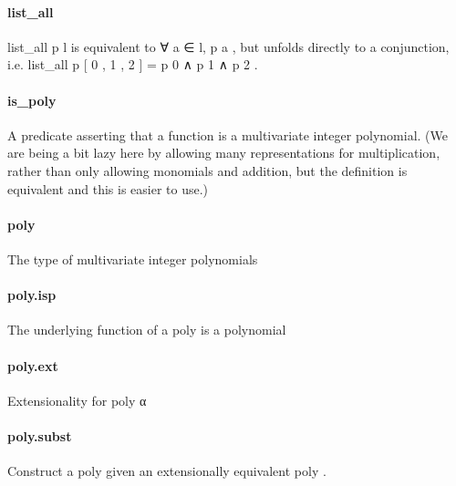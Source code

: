 \documentclass{article}
\begin{document}
\paragraph{list\_all}
\par
\colorbox[RGB]{253,246,227}{{{{\color[RGB]{101, 123, 131} list\_all p l }}}} is equivalent to 
\colorbox[RGB]{253,246,227}{{{{\color[RGB]{101, 123, 131} ∀ a ∈ l, p a }}}}, but unfolds directly to a conjunction,
i.e. 
\colorbox[RGB]{253,246,227}{{{{\color[RGB]{101, 123, 131} list\_all p {[} }}}{{{\color[RGB]{108, 113, 196} 0 }}}{{{\color[RGB]{101, 123, 131} ,  }}}{{{\color[RGB]{108, 113, 196} 1 }}}{{{\color[RGB]{101, 123, 131} ,  }}}{{{\color[RGB]{108, 113, 196} 2 }}}{{{\color[RGB]{101, 123, 131} {]}  }}}{{{\color[RGB]{181, 137, 0} = }}}{{{\color[RGB]{101, 123, 131}  p  }}}{{{\color[RGB]{108, 113, 196} 0 }}}{{{\color[RGB]{101, 123, 131}   }}}{{{\color[RGB]{181, 137, 0} ∧ }}}{{{\color[RGB]{101, 123, 131}  p  }}}{{{\color[RGB]{108, 113, 196} 1 }}}{{{\color[RGB]{101, 123, 131}   }}}{{{\color[RGB]{181, 137, 0} ∧ }}}{{{\color[RGB]{101, 123, 131}  p  }}}{{{\color[RGB]{108, 113, 196} 2 }}}}.
\paragraph{is\_poly}
\par
A predicate asserting that a function is a multivariate integer polynomial.
(We are being a bit lazy here by allowing many representations for multiplication,
rather than only allowing monomials and addition, but the definition is equivalent
and this is easier to use.)
\paragraph{poly}
\par
The type of multivariate integer polynomials
\paragraph{poly.isp}
\par
The underlying function of a 
\colorbox[RGB]{253,246,227}{{{{\color[RGB]{101, 123, 131} poly }}}} is a polynomial
\paragraph{poly.ext}
\par
Extensionality for 
\colorbox[RGB]{253,246,227}{{{{\color[RGB]{101, 123, 131} poly α }}}}\paragraph{poly.subst}
\par
Construct a 
\colorbox[RGB]{253,246,227}{{{{\color[RGB]{101, 123, 131} poly }}}} given an extensionally equivalent 
\colorbox[RGB]{253,246,227}{{{{\color[RGB]{101, 123, 131} poly }}}}.
\end{document}
